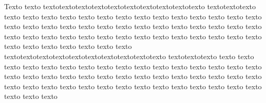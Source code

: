 Texto texto textotextotextotextotextotextotextotextotextotexto textotextotexto texto texto texto texto texto texto texto texto texto texto texto texto texto texto texto texto texto texto texto texto texto texto texto texto texto texto texto texto texto texto texto texto texto texto texto texto texto texto texto texto texto texto texto texto texto texto texto texto texto textotextotextotextotextotextotextotextotextotexto textotextotexto texto texto texto texto texto texto texto texto texto texto texto texto texto texto texto texto texto texto texto texto texto texto texto texto texto texto texto texto texto texto texto texto texto texto texto texto texto texto texto texto texto texto texto texto texto texto texto 
